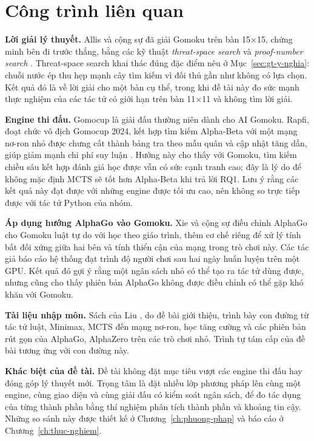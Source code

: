 \section{Công trình liên quan}
\label{sec:lt-lien-quan}
\textbf{Lời giải lý thuyết.} Allis và cộng sự đã giải Gomoku trên bàn 15×15, chứng minh bên đi trước thắng, bằng các kỹ thuật \emph{threat-space search} và \emph{proof-number search} \cite{allis1994,allis1996gomoku}. Threat-space search khai thác đúng đặc điểm nêu ở Mục~\ref{sec:gt-y-nghia}: chuỗi nước ép thu hẹp mạnh cây tìm kiếm vì đối thủ gần như không có lựa chọn. Kết quả đó là về lời giải cho một bàn cụ thể, trong khi đề tài này đo sức mạnh thực nghiệm của các tác tử có giới hạn trên bàn 11×11 và không tìm lời giải.

\textbf{Engine thi đấu.} Gomocup là giải đấu thường niên dành cho AI Gomoku. Rapfi, đoạt chức vô địch Gomocup 2024, kết hợp tìm kiếm Alpha-Beta với một mạng nơ-ron nhỏ được chưng cất thành bảng tra theo mẫu quân và cập nhật tăng dần, giúp giảm mạnh chi phí suy luận \cite{jin2025rapfi}. Hướng này cho thấy với Gomoku, tìm kiếm chiều sâu kết hợp đánh giá học được vẫn có sức cạnh tranh cao; đây là lý do để không mặc định MCTS sẽ tốt hơn Alpha-Beta khi trả lời RQ1. Lưu ý rằng các kết quả này đạt được với những engine được tối ưu cao, nên không so trực tiếp được với tác tử Python của nhóm.

\textbf{Áp dụng hướng AlphaGo vào Gomoku.} Xie và cộng sự \cite{xie2018alphagomoku} điều chỉnh AlphaGo cho Gomoku luật tự do với học theo giáo trình, thêm cơ chế riêng để xử lý tính bất đối xứng giữa hai bên và tính thiển cận của mạng trong trò chơi này. Các tác giả báo cáo hệ thống đạt trình độ người chơi sau hai ngày huấn luyện trên một GPU. Kết quả đó gợi ý rằng một ngân sách nhỏ có thể tạo ra tác tử dùng được, nhưng cũng cho thấy phiên bản AlphaGo không được điều chỉnh có thể gặp khó khăn với Gomoku.

\textbf{Tài liệu nhập môn.} Sách của Liu \cite{liu2024alphago}, do đề bài giới thiệu, trình bày con đường từ tác tử luật, Minimax, MCTS đến mạng nơ-ron, học tăng cường và các phiên bản rút gọn của AlphaGo, AlphaZero trên các trò chơi nhỏ. Trình tự tám cấp của đề bài tương ứng với con đường này.

\textbf{Khác biệt của đề tài.} Đề tài không đặt mục tiêu vượt các engine thi đấu hay đóng góp lý thuyết mới. Trọng tâm là đặt nhiều lớp phương pháp lên cùng một engine, cùng giao diện và cùng giải đấu có kiểm soát ngân sách, để đo tác dụng của từng thành phần bằng thí nghiệm phân tích thành phần và khoảng tin cậy. Những so sánh này được thiết kế ở Chương~\ref{ch:phuong-phap} và báo cáo ở Chương~\ref{ch:thuc-nghiem}.

